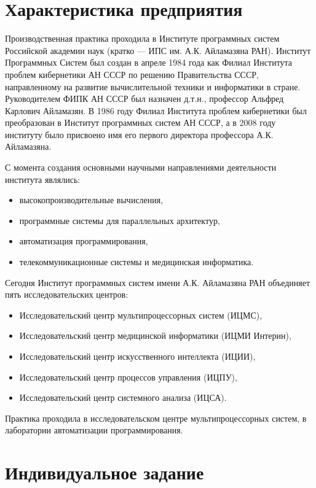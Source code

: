 \documentclass[14pt, russian]{scrartcl}
\begin{document}
\section{Характеристика предприятия}

Производственная практика проходила в Институте программных систем
Российской академии наук (кратко --- ИПС им. А.К. Айламазяна РАН). Институт Программных Систем был создан в апреле 1984 года как Филиал Института проблем кибернетики АН СССР по решению Правительства СССР, направленному на развитие вычислительной техники и информатики в стране. Руководителем ФИПК АН СССР был назначен д.т.н., профессор Альфред Карлович Айламазян. В 1986 году Филиал Института проблем кибернетики был преобразован в Институт программных систем АН СССР, а в 2008 году институту было присвоено имя его первого директора профессора А.К. Айламазяна. 

С момента создания основными научными направлениями
деятельности института являлись:
\begin{itemize}
\item высокопроизводительные вычисления,
\item программные системы для параллельных архитектур,
\item автоматизация программирования,
\item телекоммуникационные системы и медицинская информатика.
\end{itemize}

Сегодня Институт программных систем имени А.К. Айламазяна РАН объединяет пять исследовательских центров:
\begin{itemize}
\item Исследовательский центр мультипроцессорных систем (ИЦМС),
\item Исследовательский центр медицинской информатики (ИЦМИ Интерин),
\item Исследовательский центр искусственного интеллекта (ИЦИИ),
\item Исследовательский центр процессов управления (ИЦПУ),
\item Исследовательский центр системного анализа (ИЦСА).
\end{itemize}

Практика проходила в исследовательском центре мультипроцессорных систем, в лаборатории автоматизации программирования.

\newpage
\section{Индивидуальное задание}
\end{document}

